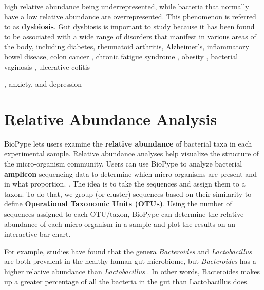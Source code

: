 high relative abundance being underrepresented, while bacteria that normally have a low relative abundance are overrepresented. This phenomenon is referred to as \textbf{dysbiosis}. Gut dysbiosis is important to study because it has been found to be associated with a wide range of disorders that manifest in various areas of the body, including diabetes, rheumatoid arthritis, Alzheimer's, inflammatory bowel disease, colon cancer \citep{Buford2017, Kennedy2014, Castellarin2012},  chronic fatigue syndrome \citep{Lakhan2010}, obesity \citep{Turnbaugh2006,Turnbaugh2009}, bacterial vaginosis \citep{Africa2014}, ulcerative colitis {\citep{Mandal2015, Matsuoka2015}, anxiety, and depression \citep{Evrensel2015, Lach2018}
%
\section{Relative Abundance Analysis}
%
%
BioPype lets users examine the \textbf{relative abundance} of bacterial taxa in each experimental sample. Relative abundance analyses help visualize the structure of the micro-organism community. Users can use BioPype to analyze bacterial \textbf{amplicon} sequencing data to determine which micro-organisms are present and in what proportion.
%
.
%
The idea is to take the sequences and assign them to a taxon. To do that, we group (or cluster) sequences based on their similarity to define \textbf{Operational Taxonomic Units (OTUs)}. 
%
%
Using the number of sequences assigned to each OTU/taxon, BioPype can determine the relative abundance of each micro-organism in a sample and plot the results on an interactive bar chart.

For example, studies have found that the genera \textit{Bacteroides} and \textit{Lactobacillus} are both prevalent in the healthy human gut microbiome, but \textit{Bacteroides} has a higher relative abundance than \textit{Lactobacillus} \cite{Lloyd-Price2016}. In other words, Bacteroides makes up a greater percentage of all the bacteria in the gut than Lactobacillus does.

}
